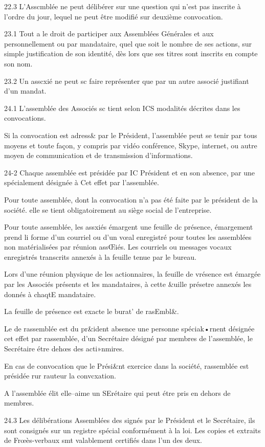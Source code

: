 \documentclass{article}
\begin{document}
22.3 L'Asscmblée ne peut délibérer sur une question qui n'est pas inscrite à l'ordre du jour, lequel ne peut être modifié sur deuxième convocation.

23.1 Tout a le droit de participer aux Assemblées Générales et aux personnellement ou par mandataire, quel que soit le nombre de ses actions, sur simple justification de son identité, dès lors que ses titres sont inscrits en compte son nom.

23.2 Un asscxié ne peut sc faire représenter que par un autre associé justifiant d'un mandat.

24.1 L'assemblée des Associés sc tient selon ICS modalités décrites dans les convocations.

Si la convocation est adress& par le Président, l'assemblée peut se tenir par tous moyens et toute façon, y compris par vidéo conférence, Skype, internet, ou autre moyen de communication et de transmission d'informations.

24-2 Chaque assemblée est présidée par IC Président et en son absence, par une spécialement désignée à Cet effet par l'assemblée.

Pour toute assemblée, dont la convocation n'a pas été faite par le président de la société. elle se tient obligatoirement au siège social de l'entreprise.

Pour toute assemblée, les assxiés émargent une feuille dc présence, émargement prend li forme d'un courriel ou d'un vœal enregistré pour toutes les assemblées non matérialisées par réunion assŒiés. Les courriels ou messages vocaux enregistrés transcrits annexés à la feuille tenue par le bureau.

Lors d'une réunion physique de les actionnaires, la feuille de vrésence est émargée par les Associés présents et les mandataires, à cette &uille présetre annexés les donnés à chaqtE mandataire.

La feuille de présence est exacte le burat' de rasEmbl&.

Le de rassemblée est du pr&ident absence une personne spéciak•rnent désignée cet effet par rassemblée, d'un Secrétaire désigné par membres de l'assemblée, le Secrétaire étre dehœs des acti»nmires.

En cas de convocation que le Prési&nt exercice dans la société, rassemblée est présidée rur rauteur la convcxation.

A l'assemblée élit elle--aime un SErétaire qui peut étre pris en dehors de membres.

24.3 Les délibérations Assemblées des signés par le Président et le Secrétaire, ils sont consignés sur un registre spécial conformément à la loi. Les copies et extraits de Frœès-verbaux smt valablement certifiés dans l'un des deux.
\end{document}
